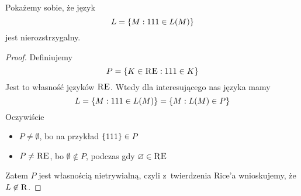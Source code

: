 \begin{example}
	Pokażemy sobie, że język
	\[
		L = \set{M : 111 \in L\pars{M}}
	\]
	jest nierozstrzygalny.
	\begin{proof}
		Definiujemy
		\[
			P = \set{K \in \re : 111 \in K}
		\]
		Jest to własność języków \(\textsc{RE}\).
		Wtedy dla interesującego nas języka mamy
		\[
			L = \set{M : 111 \in L\pars{M}} = \set{M : L\pars{M} \in P}
		\]
		Oczywiście
		\begin{itemize}
			\item \(P \neq \emptyset\), bo na przykład \(\set{111} \in P\)
			\item \(P \neq \textsc{RE}\), bo \(\emptyset \not\in P\), podczas gdy \(\varnothing \in \textsc{RE}\)
		\end{itemize}
		Zatem \(P\) jest własnością nietrywialną, czyli z~twierdzenia Rice'a wnioskujemy, że \(L \not\in \textsc{R}\).
	\end{proof}
\end{example}
